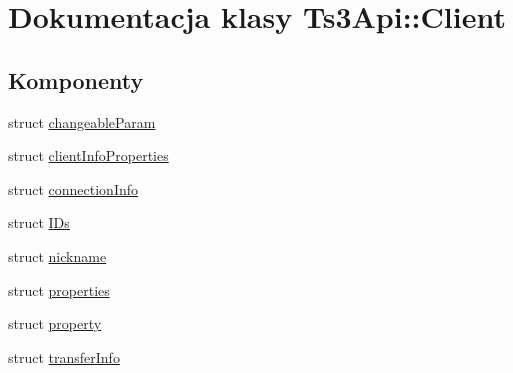 \hypertarget{class_ts3_api_1_1_client}{}\section{Dokumentacja klasy Ts3\+Api\+:\+:Client}
\label{class_ts3_api_1_1_client}
\subsection*{Komponenty}
\begin{DoxyCompactItemize}
\item 
struct \hyperlink{struct_ts3_api_1_1_client_1_1changeable_param}{changeable\+Param}
\item 
struct \hyperlink{struct_ts3_api_1_1_client_1_1client_info_properties}{client\+Info\+Properties}
\item 
struct \hyperlink{struct_ts3_api_1_1_client_1_1connection_info}{connection\+Info}
\item 
struct \hyperlink{struct_ts3_api_1_1_client_1_1_i_ds}{I\+Ds}
\item 
struct \hyperlink{struct_ts3_api_1_1_client_1_1nickname}{nickname}
\item 
struct \hyperlink{struct_ts3_api_1_1_client_1_1properties}{properties}
\item 
struct \hyperlink{struct_ts3_api_1_1_client_1_1property}{property}
\item 
struct \hyperlink{struct_ts3_api_1_1_client_1_1transfer_info}{transfer\+Info}
\end{DoxyCompactItemize}
